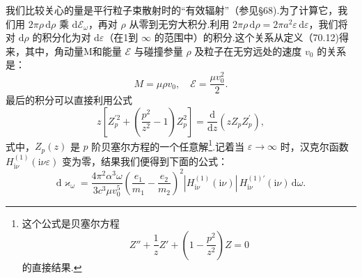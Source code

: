 我们比较关心的量是平行粒子束散射时的“有效辐射”（参见§68).为了计算它，我们用 $2\pi\rho\,\mathrm{d}\rho$ 乘 $\mathrm{d}\mathcal{E}_\omega$，再对 $\rho$ 从零到无穷大积分.利用 $2\pi\rho\,\mathrm{d}\rho=2\pi a^2\varepsilon\,\mathrm{d}\varepsilon$，我们将对 $\mathrm{d}\rho$ 的积分化为对 $\mathrm{d}\varepsilon$（在1到 $\infty$ 的范围中）的积分.这个关系从定义（70.12)得来，其中，角动量M和能量 $\mathcal{E}$ 与碰撞参量 $\rho$ 及粒子在无穷远处的速度 $v_0$ 的关系是：
\begin{equation*}
  M=\mu\rho v_0,\quad
  \mathcal{E}=\frac{\mu v_0^2}{2}.
\end{equation*}
最后的积分可以直接利用公式
\begin{equation*}
  z\left[Z_p^{\prime 2}+\left(\frac{p^2}{z^2}-1\right)Z_p^2\right]=\frac{\mathrm{d}}{\mathrm{d}z}\left(zZ_pZ_p^{\prime}\right),
\end{equation*}
式中，$Z_p(z)$ 是 $p$ 阶贝塞尔方程的一个任意解\footnote{这个公式是贝塞尔方程
\begin{equation*}
  Z''+\frac{1}{z}Z'+\left(1-\frac{p^2}{z^2}\right)Z=0
\end{equation*}
的直接结果.}.记着当 $\varepsilon\to\infty$ 时，汉克尔函数 $H_{\mathrm{i}\nu}^{(1)}(\mathrm{i}\nu\varepsilon)$ 变为零，结果我们便得到下面的公式：
\begin{equation}
  \mathrm{d}\varkappa_\omega=\frac{4\pi^2\alpha^3\omega}{3c^3\mu v_0^5}\left(\frac{e_1}{m_1}-\frac{e_2}{m_2}\right)^2
  |H_{\mathrm{i}\nu}^{(1)}(\mathrm{i}\nu)|\,H_{\mathrm{i}\nu}^{(1)\prime}(\mathrm{i}\nu)\,\mathrm{d}\omega.
\end{equation}

